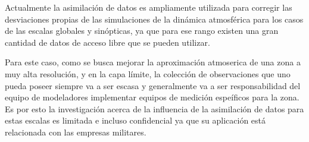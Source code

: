 Actualmente la asimilación de datos es ampliamente utilizada para corregir las desviaciones propias de las simulaciones de la dinámica atmosférica para los casos de las escalas globales y sinópticas, ya que para ese rango existen una gran cantidad de datos de acceso libre que se pueden utilizar.

Para este caso, como se busca mejorar la aproximación atmoserica de una zona a muy alta resolución, y en la capa límite, la colección de observaciones que uno pueda poseer siempre va a ser escasa y generalmente va a ser responsabilidad del equipo de modeladores implementar equipos de medición espeíficos para la zona. Es por esto la investigación acerca de la influencia de la asimilación de datos para estas escalas es limitada e incluso confidencial ya que su aplicación está relacionada con las empresas militares.



